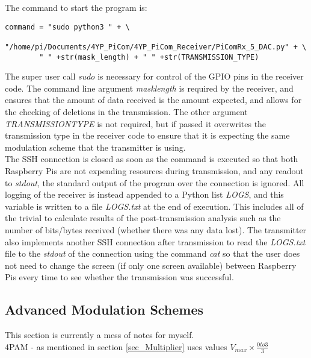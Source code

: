 \documentclass[../main.tex]{subfiles}
\begin{document}
The command to start the program is:

\begin{lstlisting}[caption=Command Line to Start the Receiver]
	command = "sudo python3 " + \
		"/home/pi/Documents/4YP_PiCom/4YP_PiCom_Receiver/PiComRx_5_DAC.py" + \
		" " +str(mask_length) + " " +str(TRANSMISSION_TYPE)
\end{lstlisting}

The super user call \textit{sudo} is necessary for control of the GPIO pins in the receiver code.
The command line argument \textit{mask\textunderscore length} is required by the receiver, and ensures that the amount of data received is the amount expected, and allows for the checking of deletions in the transmission.
The other argument \textit{TRANSMISSION\textunderscore TYPE} is not required, but if passed it overwrites the transmission type in the receiver code to ensure that it is expecting the same modulation scheme that the transmitter is using.\\

The SSH connection is closed as soon as the command is executed so that both Raspberry Pis are not expending resources during transmission, and any readout to \textit{stdout}, the standard output of the program over the connection is ignored.
All logging of the receiver is instead appended to a Python list \textit{LOGS}, and this variable is written to a file \textit{LOGS.txt} at the end of execution.
This includes all of the trivial to calculate results of the post-transmission analysis such as the number of bits/bytes received (whether there was any data lost).
\todo[inline]{Clearly check below once done}
The transmitter also implements another SSH connection after transmission to read the \textit{LOGS.txt} file to the \textit{stdout} of the connection using the command \textit{cat} so that the user does not need to change the screen (if only one screen available) between Raspberry Pis every time to see whether the transmission was successful.\\

\subsection{Advanced Modulation Schemes} \label{sec_Advanced Modulation Schemes}

This section is currently a mess of notes for myself.\\
4PAM - as mentioned in section \ref{sec_Multiplier} uses values $V_{max}\times\frac{0 to 3}{3}$
\end{document}
